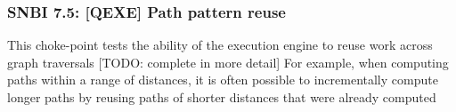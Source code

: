 \subsubsection{SNBI 7.5: [QEXE] Path pattern reuse}
\label{choke_point_7.5}
This choke-point tests the ability of the execution engine to reuse work across graph traversals [TODO: complete in more detail]
For example, when computing paths within a range of distances, it is often possible to incrementally compute longer paths by reusing paths of shorter distances that were already computed

